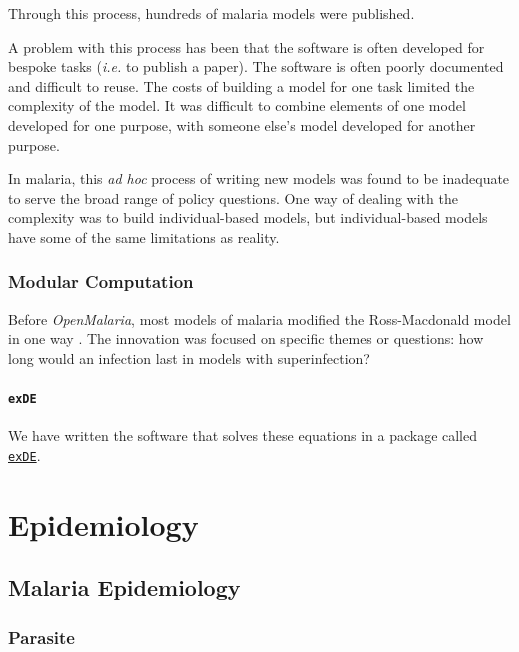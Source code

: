 \documentclass[
]{book}
\begin{document}
Through this process, hundreds of malaria models were published.

A problem with this process has been that the software is often developed for bespoke tasks (\emph{i.e.} to publish a paper). The software is often poorly documented and difficult to reuse. The costs of building a model for one task limited the complexity of the model. It was difficult to combine elements of one model developed for one purpose, with someone else's model developed for another purpose.

In malaria, this \emph{ad hoc} process of writing new models was found to be inadequate to serve the broad range of policy questions. One way of dealing with the complexity was to build individual-based models, but individual-based models have some of the same limitations as reality.

\section{Modular Computation}\label{modular-computation}

Before \emph{OpenMalaria}, most models of malaria modified the Ross-Macdonald model in one way \autocite{ReinerRC2013SystematicReview}. The innovation was focused on specific themes or questions: how long would an infection last in models with superinfection?

\subsection{\texorpdfstring{\texttt{exDE}}{exDE}}\label{exde}

We have written the software that solves these equations in a package called \href{https://cran.r-project.org/web/packages/exDE/index.html}{\texttt{exDE}}.

\part{Epidemiology}\label{part-epidemiology}

\chapter{Malaria Epidemiology}\label{malaria-epidemiology-1}

\section{Parasite}\label{parasite}
\end{document}
